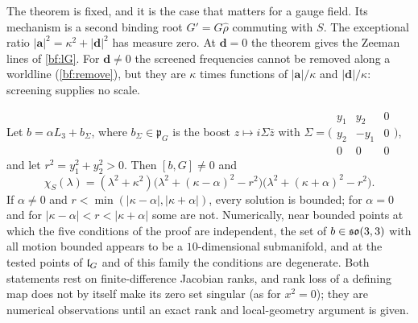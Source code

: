 The theorem is fixed, and it is the case that matters for a gauge field. Its mechanism is a second binding root $G'=G\hat\rho$ commuting with $S$. The exceptional ratio $|\mathbf a|^2=\kappa^2+|\mathbf d|^2$ has
measure zero. At $\mathbf d=0$ the theorem gives the Zeeman lines of \cref{bf:lG}. For $\mathbf d\neq0$ the screened frequencies cannot be removed
along a worldline (\cref{bf:remove}), but they are $\kappa$ times functions of $|\mathbf a|/\kappa$ and $|\mathbf d|/\kappa$: screening supplies no
scale.

\begin{proposition}
\label{bf:gyro}
Let $b=\alpha L_3+b_\Sigma$, where $b_\Sigma\in\mathfrak p_G$ is the boost $z\mapsto i\Sigma\bar z$ with
$\Sigma=\bigl(\begin{smallmatrix}y_1&y_2&0\\y_2&-y_1&0\\0&0&0\end{smallmatrix}\bigr)$, and let $r^2=y_1^2+y_2^2>0$. Then $[b,G]\neq0$ and
\[
\chi_S(\lambda)=(\lambda^2+\kappa^2)\bigl(\lambda^2+(\kappa-\alpha)^2-r^2\bigr)\bigl(\lambda^2+(\kappa+\alpha)^2-r^2\bigr).
\]
If $\alpha\neq0$ and $r<\min(|\kappa-\alpha|,|\kappa+\alpha|)$, every solution is bounded; for $\alpha=0$ and for $|\kappa-\alpha|<r<|\kappa+\alpha|$ some
are not. Numerically, near bounded points at which the five conditions of the proof are independent, the set of $b\in\mathfrak{so}(3,3)$ with all motion
bounded appears to be a $10$-dimensional submanifold, and at the tested points of $\mathfrak l_G$ and of this family the conditions are degenerate. Both
statements rest on finite-difference Jacobian ranks, and rank loss of a defining map does not by itself make its zero set singular (as for
$x^2=0$); they are numerical observations until an exact rank and local-geometry argument is given.
\end{proposition}

